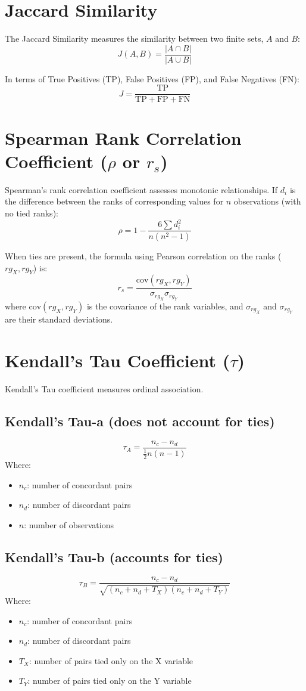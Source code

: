 \documentclass{article}
\begin{document}
\section*{Jaccard Similarity}

The Jaccard Similarity measures the similarity between two finite sets, $A$ and $B$:
$$J(A, B) = \frac{|A \cap B|}{|A \cup B|}$$

In terms of True Positives (TP), False Positives (FP), and False Negatives (FN):
$$J = \frac{\text{TP}}{\text{TP} + \text{FP} + \text{FN}}$$

\section*{Spearman Rank Correlation Coefficient ($\rho$ or $r_s$)}

Spearman's rank correlation coefficient assesses monotonic relationships. If $d_i$ is the difference between the ranks of corresponding values for $n$ observations (with no tied ranks):
$$\rho = 1 - \frac{6 \sum d_i^2}{n(n^2 - 1)}$$

When ties are present, the formula using Pearson correlation on the ranks ($rg_X, rg_Y$) is:
$$r_s = \frac{\text{cov}(rg_X, rg_Y)}{\sigma_{rg_X} \sigma_{rg_Y}}$$
where $\text{cov}(rg_X, rg_Y)$ is the covariance of the rank variables, and $\sigma_{rg_X}$ and $\sigma_{rg_Y}$ are their standard deviations.

\section*{Kendall's Tau Coefficient ($\tau$)}

Kendall's Tau coefficient measures ordinal association.

\subsection*{Kendall's Tau-a (does not account for ties)}
$$ \tau_A = \frac{n_c - n_d}{\frac{1}{2} n (n-1)} $$
Where:
\begin{itemize}
    \item $n_c$: number of concordant pairs
    \item $n_d$: number of discordant pairs
    \item $n$: number of observations
\end{itemize}

\subsection*{Kendall's Tau-b (accounts for ties)}
$$ \tau_B = \frac{n_c - n_d}{\sqrt{(n_c + n_d + T_X)(n_c + n_d + T_Y)}} $$
Where:
\begin{itemize}
    \item $n_c$: number of concordant pairs
    \item $n_d$: number of discordant pairs
    \item $T_X$: number of pairs tied only on the X variable
    \item $T_Y$: number of pairs tied only on the Y variable
\end{itemize}
\end{document}
